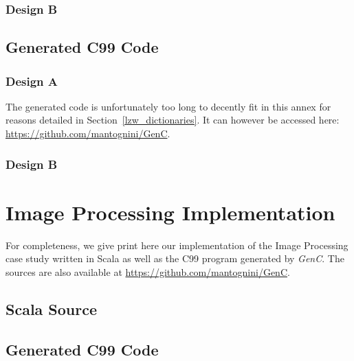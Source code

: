 \documentclass[a4paper,twoside]{article}
\let\oldsection\section
\renewcommand\section{\cleardoublepage\oldsection}
\newcommand{\GenC}{\emph{GenC}\xspace}
\newcommand{\RefSec}[1]{Section~\ref{#1}}
\begin{document}
\begin{landscape}
\clearpage
\subsubsection*{Design B}
\label{lzw_impl_scala_b}


\clearpage
\subsection{Generated C99 Code}

\subsubsection*{Design A}
\label{lzw_impl_c_b}

The generated code is unfortunately too long to decently fit in this annex for
reasons detailed in \RefSec{lzw_dictionaries}. It can however be accessed here:
\url{https://github.com/mantognini/GenC}.

\subsubsection*{Design B}
\label{lzw_impl_c_b}


\section{Image Processing Implementation}
\label{img_proc_code}

For completeness, we give print here our implementation of the Image Processing
case study written in Scala as well as the C99 program generated by \GenC. The
sources are also available at \url{https://github.com/mantognini/GenC}.

\subsection{Scala Source}
\label{img_proc_scala}


\clearpage
\subsection{Generated C99 Code}
\label{img_proc_c}


\end{landscape}

\clearpage



\end{document}
